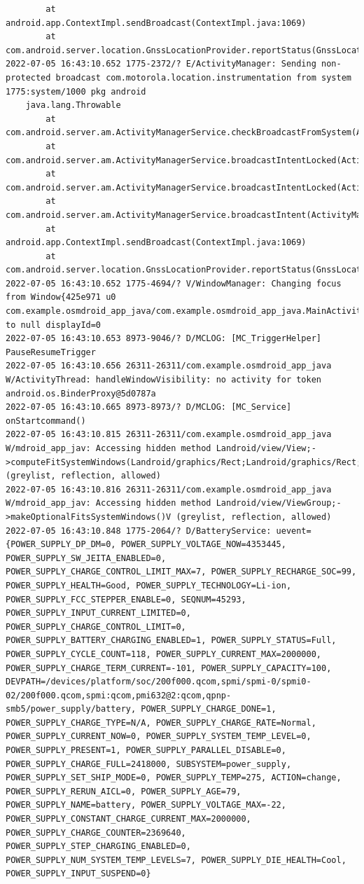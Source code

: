 \documentclass[a4paper,12pt]{book}
\begin{document}
\begin{lstlisting}
        at android.app.ContextImpl.sendBroadcast(ContextImpl.java:1069)
        at com.android.server.location.GnssLocationProvider.reportStatus(GnssLocationProvider.java:1497)
2022-07-05 16:43:10.652 1775-2372/? E/ActivityManager: Sending non-protected broadcast com.motorola.location.instrumentation from system 1775:system/1000 pkg android
    java.lang.Throwable
        at com.android.server.am.ActivityManagerService.checkBroadcastFromSystem(ActivityManagerService.java:15425)
        at com.android.server.am.ActivityManagerService.broadcastIntentLocked(ActivityManagerService.java:16073)
        at com.android.server.am.ActivityManagerService.broadcastIntentLocked(ActivityManagerService.java:15442)
        at com.android.server.am.ActivityManagerService.broadcastIntent(ActivityManagerService.java:16227)
        at android.app.ContextImpl.sendBroadcast(ContextImpl.java:1069)
        at com.android.server.location.GnssLocationProvider.reportStatus(GnssLocationProvider.java:1497)
2022-07-05 16:43:10.652 1775-4694/? V/WindowManager: Changing focus from Window{425e971 u0 com.example.osmdroid_app_java/com.example.osmdroid_app_java.MainActivity} to null displayId=0
2022-07-05 16:43:10.653 8973-9046/? D/MCLOG: [MC_TriggerHelper] PauseResumeTrigger
2022-07-05 16:43:10.656 26311-26311/com.example.osmdroid_app_java W/ActivityThread: handleWindowVisibility: no activity for token android.os.BinderProxy@5d0787a
2022-07-05 16:43:10.665 8973-8973/? D/MCLOG: [MC_Service] onStartcommand()
2022-07-05 16:43:10.815 26311-26311/com.example.osmdroid_app_java W/mdroid_app_jav: Accessing hidden method Landroid/view/View;->computeFitSystemWindows(Landroid/graphics/Rect;Landroid/graphics/Rect;)Z (greylist, reflection, allowed)
2022-07-05 16:43:10.816 26311-26311/com.example.osmdroid_app_java W/mdroid_app_jav: Accessing hidden method Landroid/view/ViewGroup;->makeOptionalFitsSystemWindows()V (greylist, reflection, allowed)
2022-07-05 16:43:10.848 1775-2064/? D/BatteryService: uevent={POWER_SUPPLY_DP_DM=0, POWER_SUPPLY_VOLTAGE_NOW=4353445, POWER_SUPPLY_SW_JEITA_ENABLED=0, POWER_SUPPLY_CHARGE_CONTROL_LIMIT_MAX=7, POWER_SUPPLY_RECHARGE_SOC=99, POWER_SUPPLY_HEALTH=Good, POWER_SUPPLY_TECHNOLOGY=Li-ion, POWER_SUPPLY_FCC_STEPPER_ENABLE=0, SEQNUM=45293, POWER_SUPPLY_INPUT_CURRENT_LIMITED=0, POWER_SUPPLY_CHARGE_CONTROL_LIMIT=0, POWER_SUPPLY_BATTERY_CHARGING_ENABLED=1, POWER_SUPPLY_STATUS=Full, POWER_SUPPLY_CYCLE_COUNT=118, POWER_SUPPLY_CURRENT_MAX=2000000, POWER_SUPPLY_CHARGE_TERM_CURRENT=-101, POWER_SUPPLY_CAPACITY=100, DEVPATH=/devices/platform/soc/200f000.qcom,spmi/spmi-0/spmi0-02/200f000.qcom,spmi:qcom,pmi632@2:qcom,qpnp-smb5/power_supply/battery, POWER_SUPPLY_CHARGE_DONE=1, POWER_SUPPLY_CHARGE_TYPE=N/A, POWER_SUPPLY_CHARGE_RATE=Normal, POWER_SUPPLY_CURRENT_NOW=0, POWER_SUPPLY_SYSTEM_TEMP_LEVEL=0, POWER_SUPPLY_PRESENT=1, POWER_SUPPLY_PARALLEL_DISABLE=0, POWER_SUPPLY_CHARGE_FULL=2418000, SUBSYSTEM=power_supply, POWER_SUPPLY_SET_SHIP_MODE=0, POWER_SUPPLY_TEMP=275, ACTION=change, POWER_SUPPLY_RERUN_AICL=0, POWER_SUPPLY_AGE=79, POWER_SUPPLY_NAME=battery, POWER_SUPPLY_VOLTAGE_MAX=-22, POWER_SUPPLY_CONSTANT_CHARGE_CURRENT_MAX=2000000, POWER_SUPPLY_CHARGE_COUNTER=2369640, POWER_SUPPLY_STEP_CHARGING_ENABLED=0, POWER_SUPPLY_NUM_SYSTEM_TEMP_LEVELS=7, POWER_SUPPLY_DIE_HEALTH=Cool, POWER_SUPPLY_INPUT_SUSPEND=0}

\end{lstlisting}
\end{document}
